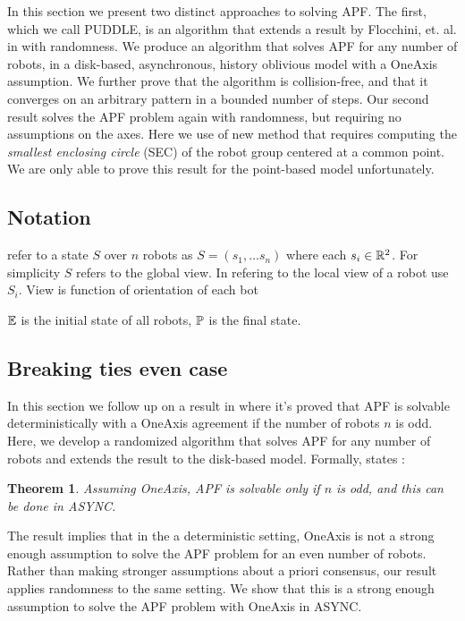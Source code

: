 \documentclass[preprint,10pt]{elsarticle}
\newtheorem{theorem}{Theorem}
\begin{document}
In this section we present two distinct approaches to solving APF. The first, which we call PUDDLE, is 
an algorithm that extends a result by Flocchini, et. al. in \cite{flocchini08arbitrary} with randomness.
We produce an algorithm that solves APF for any number of robots, in a disk-based, asynchronous, history
oblivious model with a OneAxis assumption. We further prove that the algorithm is collision-free, and
that it converges on an arbitrary pattern in a bounded number of steps. 
Our second result solves the APF problem again with randomness, but requiring no assumptions on the axes.
Here we use of new method that requires computing the \textit{smallest enclosing circle} (SEC) of
the robot group centered at a common point. We are only able to prove this result for the point-based
model unfortunately.

\subsection{Notation} 
refer to a state $S$ over $n$ robots as $S = (s_1, \ldots s_n)$ where each $s_i \in \mathbb{R}^2$. For simplicity
$S$ refers to the global view. In refering to the local view of a robot use $S_i$. View is function of orientation
of each bot



$\mathbb{E}$ is the initial state of all robots, $\mathbb{P}$ is the final state.

\subsection{Breaking ties even case } 
	In this section we follow up on a result in \cite{flocchini12distrib} where it's proved that
	APF is solvable deterministically with a OneAxis agreement if the number of robots $n$ is
	odd. Here, we develop a randomized algorithm that solves APF for any number of robots
	and extends the result to the disk-based model. Formally, \cite{flocchini12distrib} states :
	\begin{theorem} 
		Assuming OneAxis, APF is solvable only if $n$ is odd, and this can be done in ASYNC.
	\end{theorem} 

	The result implies that in the a deterministic setting, OneAxis is not a strong enough 
	assumption to solve the APF problem for an even number of robots. Rather than making 
	stronger assumptions about a priori consensus, our result applies randomness to the same setting. 
	We show that this is a strong enough assumption to solve the 
	APF problem with OneAxis in ASYNC. 
\end{document}
